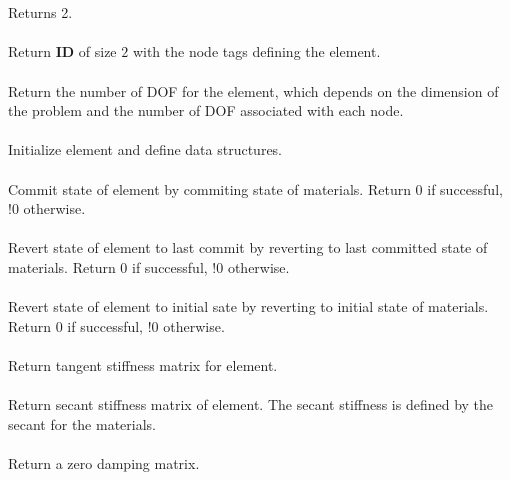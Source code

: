   \\
 \\
Returns 2.
\\

 \\
Return {\bf ID} of size $2$ with the node tags defining the element.
\\

 \\	
Return the number of DOF for the element, which depends on the dimension of the problem
and the number of DOF associated with each node.
\\

 \\
Initialize element and define data structures.
\\

 \\
Commit state of element by commiting state of materials.
Return 0 if successful, !0 otherwise.
\\

 \\        
Revert state of element to last commit by reverting to last committed state of materials.
Return 0 if successful, !0 otherwise.
\\

 \\        
Revert state of element to initial sate by reverting to initial state of materials.
Return 0 if successful, !0 otherwise.
\\

 \\
Return tangent stiffness matrix for element.
\\

 \\    
Return secant stiffness matrix of element.  The secant stiffness is
defined by the secant for the materials.
\\

 \\    
Return a zero damping matrix.
\\

